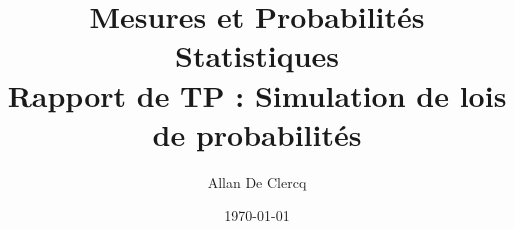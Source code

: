 \def\projecttitle{Rapport de TP : Simulation de lois de probabilités}
\def\projecticonl{1_cover/meta/univ_lille.png} %
\def\projecticonr{1_cover/meta/ufr3s.png}       %

\title{
    \vspace{1.5cm}Mesures et Probabilités Statistiques \\ 
    \vspace{0.25cm} \LARGE{\textbf{\projecttitle}}
}

\author[1]{Allan De Clercq}



\date{\today}

\def\tutors{
    \addtutor{Assi}{N'Guessan}{Assi.Nguessan@polytech-lille.fr}
}

%
